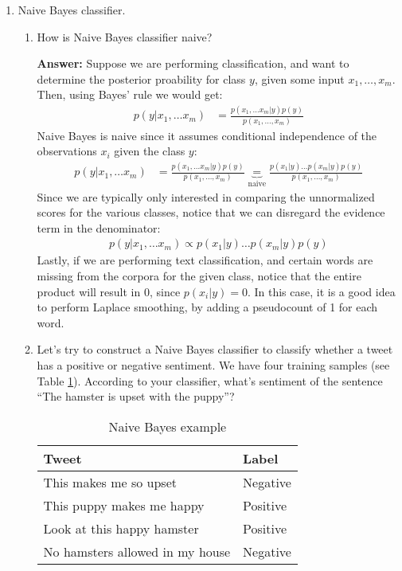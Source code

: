 \documentclass{article}
\newenvironment{QandA}{\begin{enumerate}[label=\arabic*.]}{\end{enumerate}}
\newenvironment{InnerQandA}{\begin{enumerate}[label=\roman*.]}{\end{enumerate}}
\newenvironment{answer}{\par\normalfont \textbf{Answer:}}{}
\newcommand{\g}{\vert}
\begin{document}
\begin{QandA}
    \item Naive Bayes classifier.
    \begin{InnerQandA}
        \item How is Naive Bayes classifier naive?
        \begin{answer}
            Suppose we are performing classification, and want to determine the posterior proability for class $y$, given some input $x_1, \ldots, x_m$. Then, using Bayes' rule we would get:
            \begin{align*}
                p(y \g x_1, \ldots x_m) &= \frac{p(x_1, \ldots x_m \g y) p(y)}{p(x_1, \ldots, x_m)}
            \end{align*}
            Naive Bayes is naive since it assumes conditional independence of the observations $x_i$ given the class $y$:
            \begin{align*}
                p(y \g x_1, \ldots x_m) &= \frac{p(x_1, \ldots x_m \g y) p(y)}{p(x_1, \ldots, x_m)} \underbrace{=}_{\text{naive}} \frac{p(x_1 \g y) \hdots p(x_m \g y) p(y)}{p(x_1, \ldots, x_m)}
            \end{align*} 
            Since we are typically only interested in comparing the unnormalized scores for the various classes, notice that we can disregard the evidence term in the denominator:
            \begin{align*}
                p(y \g x_1, \ldots x_m) \propto p(x_1 \g y) \hdots p(x_m \g y) p(y)
            \end{align*}
            Lastly, if we are performing text classification, and certain words are missing from the corpora for the given class, notice that the entire product will result in $0$, since $p(x_i \g y) = 0$. In this case, it is a good idea to perform Laplace smoothing, by adding a pseudocount of 1 for each word.
        \end{answer}

        \item Let’s try to construct a Naive Bayes classifier to classify whether a tweet has a positive or negative sentiment. We have four training samples (see Table \ref{tab:naive-bayes}). According to your classifier, what's sentiment of the sentence ``The hamster is upset with the puppy''?
        \begin{table}[h!]
        \centering
        \begin{tabular}{|l|l|}
        \hline
        \textbf{Tweet}                  & \textbf{Label} \\ \hline
        This makes me so upset          & Negative       \\ \hline
        This puppy makes me happy       & Positive       \\ \hline
        Look at this happy hamster      & Positive       \\ \hline
        No hamsters allowed in my house & Negative       \\ \hline
        \end{tabular}
        \caption{Naive Bayes example}
        \label{tab:naive-bayes}
        \end{table}
        

\end{InnerQandA}
\end{QandA}
\end{document}
